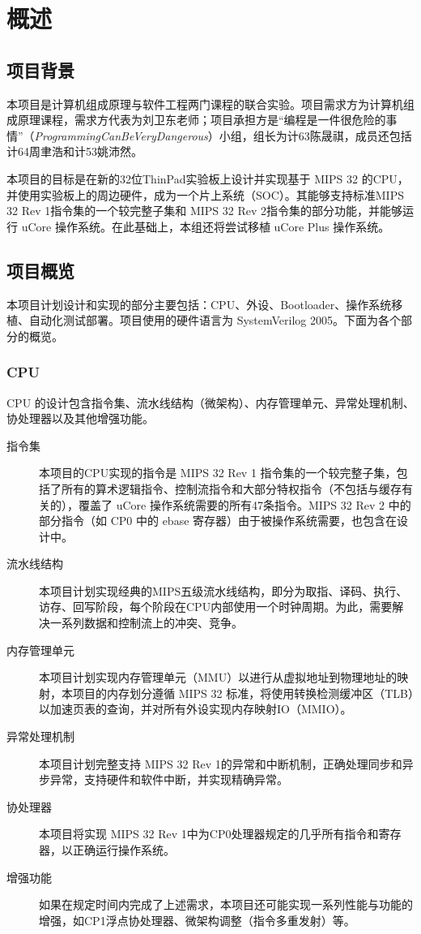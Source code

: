 \chapter{概述}

\section{项目背景}

本项目是计算机组成原理与软件工程两门课程的联合实验。项目需求方为计算机组成原理课程，需求方代表为刘卫东老师；项目承担方是“编程是一件很危险的事情”（\textit{ProgrammingCanBeVeryDangerous}）小组，组长为计63陈晟祺，成员还包括计64周聿浩和计53姚沛然。

本项目的目标是在新的32位ThinPad实验板上设计并实现基于 MIPS 32 的CPU，并使用实验板上的周边硬件，成为一个片上系统（SOC）。其能够支持标准MIPS 32 Rev 1指令集的一个较完整子集和 MIPS 32 Rev 2指令集的部分功能，并能够运行 uCore 操作系统。在此基础上，本组还将尝试移植 uCore Plus 操作系统。

\section{项目概览}

本项目计划设计和实现的部分主要包括：CPU、外设、Bootloader、操作系统移植、自动化测试部署。项目使用的硬件语言为 SystemVerilog 2005。下面为各个部分的概览。

\subsection{CPU}

CPU 的设计包含指令集、流水线结构（微架构）、内存管理单元、异常处理机制、协处理器以及其他增强功能。

\begin{description}

    \item[指令集] 本项目的CPU实现的指令是 MIPS 32 Rev 1 指令集的一个较完整子集，包括了所有的算术逻辑指令、控制流指令和大部分特权指令（不包括与缓存有关的），覆盖了 uCore 操作系统需要的所有47条指令。MIPS 32 Rev 2 中的部分指令（如 CP0 中的 ebase 寄存器）由于被操作系统需要，也包含在设计中。
    \item[流水线结构] 本项目计划实现经典的MIPS五级流水线结构，即分为取指、译码、执行、访存、回写阶段，每个阶段在CPU内部使用一个时钟周期。为此，需要解决一系列数据和控制流上的冲突、竞争。
    \item[内存管理单元] 本项目计划实现内存管理单元（MMU）以进行从虚拟地址到物理地址的映射，本项目的内存划分遵循 MIPS 32 标准，将使用转换检测缓冲区（TLB）以加速页表的查询，并对所有外设实现内存映射IO（MMIO）。
    \item[异常处理机制] 本项目计划完整支持 MIPS 32 Rev 1的异常和中断机制，正确处理同步和异步异常，支持硬件和软件中断，并实现精确异常。
    \item[协处理器] 本项目将实现 MIPS 32 Rev 1中为CP0处理器规定的几乎所有指令和寄存器，以正确运行操作系统。
    \item[增强功能] 如果在规定时间内完成了上述需求，本项目还可能实现一系列性能与功能的增强，如CP1浮点协处理器、微架构调整（指令多重发射）等。

\end{description}

